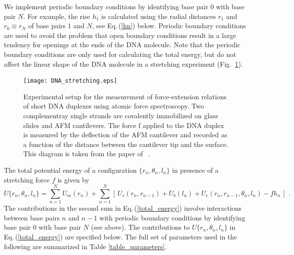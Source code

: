 \documentclass[12pt,masters,final]{UTRGVthesis}
\begin{document}
%
We implement periodic boundary conditions by identifying base pair $0$ with base pair $N$.
For example, the rise $h_1$ is calculated using the radial distances
$r_1$ and $r_0 \equiv r_N$ of base pairs $1$ and $N$, see Eq.\,(\ref{hn}) below.
Periodic boundary conditions are used to avoid the problem that open boundary
conditions result in a large tendency for openings at the ends of the DNA molecule.
Note that the periodic boundary conditions are only used for calculating the total
energy, but do not affect the linear shape of the DNA molecule in a stretching experiment
(Fig.~\ref{fig:DNA stretching}).
%
\begin{figure}[!h]
  \texttt{[image: DNA\_stretching.eps]}
  \caption{\small Experimental setup for the measurement of force-extension relations of short DNA duplexes using atomic force spectroscopy. Two complementray single strands are covalently immobilized on glass slides and AFM cantilevers. The force f applied to the DNA duplex is measured by the deflection of the AFM cantilever and recorded as a function of the distance between the cantilever tip and the surface. This diagram is taken from the paper of ~\protect\cite{zhang2015determination}. }
  \label{fig:DNA stretching}
\end{figure}
%
The total potential energy of a configuration $\{r_n, \theta_n, l_n\}$ in presence of a
stretching force $f$ is given by
%
\begin{equation} \label{total_energy}
  U\{r_n, \theta_n, l_n\} = \sum_{n=1}^N U_m(r_n)
  + \sum_{n=1}^N \left[\,U_s(r_n,r_{n-1}) + U_b(l_n) +
      U_c(r_n,r_{n-1},\theta_n,l_n) - f h_n \, \right] \, \, .
\end{equation}
%
The contributions in the second sum in Eq.\,(\ref{total_energy}) involve interactions between
base pairs $n$ and $n-1$ with periodic boundary conditions by identifying base pair
$0$ with base pair $N$ (see above).
The contributions to $U\{r_n, \theta_n, l_n\}$ in Eq.\,(\ref{total_energy}) are specified
below. The full set of parameters used in the following are summarized in
Table \ref{table_parameters}.
\newpage
\end{document}
